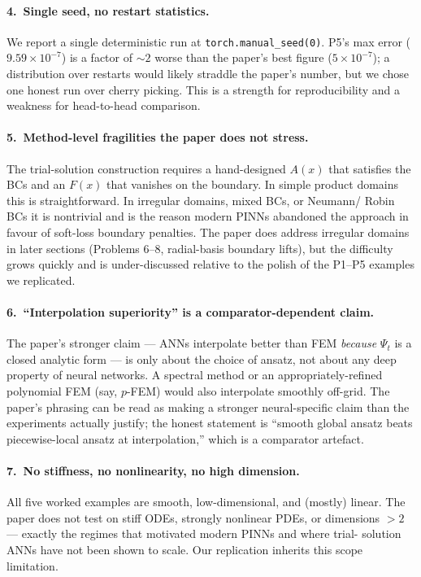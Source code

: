 \documentclass[11pt]{article}
\begin{document}
\paragraph{4.\ Single seed, no restart statistics.}
We report a single deterministic run at \texttt{torch.manual\_seed(0)}. P5's
max error ($9.59\times 10^{-7}$) is a factor of $\sim 2$ worse than the
paper's best figure ($5\times 10^{-7}$); a distribution over restarts would
likely straddle the paper's number, but we chose one honest run over cherry
picking. This is a strength for reproducibility and a weakness for
head-to-head comparison.

\paragraph{5.\ Method-level fragilities the paper does not stress.}
The trial-solution construction requires a hand-designed $A(x)$ that satisfies
the BCs and an $F(x)$ that vanishes on the boundary. In simple product
domains this is straightforward. In irregular domains, mixed BCs, or Neumann/
Robin BCs it is nontrivial and is the reason modern PINNs abandoned the
approach in favour of soft-loss boundary penalties. The paper does address
irregular domains in later sections (Problems 6--8, radial-basis boundary
lifts), but the difficulty grows quickly and is under-discussed relative to
the polish of the P1--P5 examples we replicated.

\paragraph{6.\ ``Interpolation superiority'' is a comparator-dependent claim.}
The paper's stronger claim --- ANNs interpolate better than FEM \emph{because}
$\Psi_t$ is a closed analytic form --- is only about the choice of ansatz, not
about any deep property of neural networks. A spectral method or an
appropriately-refined polynomial FEM (say, $p$-FEM) would also interpolate
smoothly off-grid. The paper's phrasing can be read as making a stronger
neural-specific claim than the experiments actually justify; the honest
statement is ``smooth global ansatz beats piecewise-local ansatz at
interpolation,'' which is a comparator artefact.

\paragraph{7.\ No stiffness, no nonlinearity, no high dimension.}
All five worked examples are smooth, low-dimensional, and (mostly) linear.
The paper does not test on stiff ODEs, strongly nonlinear PDEs, or dimensions
$>2$ --- exactly the regimes that motivated modern PINNs and where trial-
solution ANNs have not been shown to scale. Our replication inherits this
scope limitation.
\end{document}
